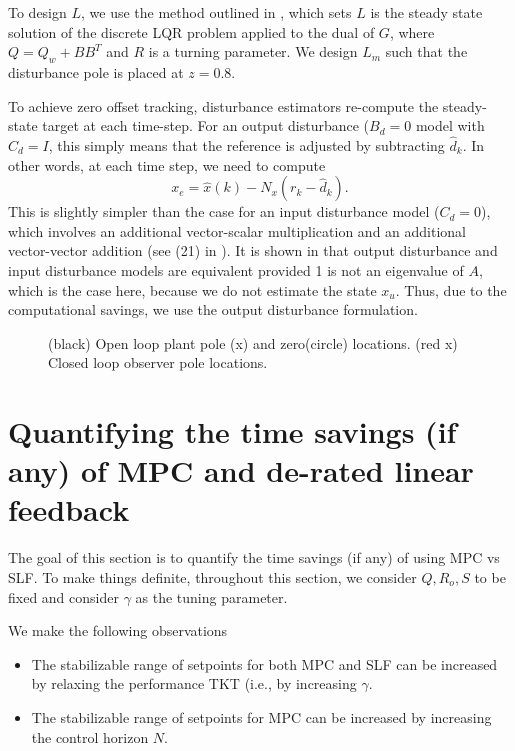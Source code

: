 \documentclass[journal,twocolumn,twoside]{IEEEtran}
\begin{document}
To design $L$, we use the method outlined in \cite{doyle_robustness_1979}, which sets $L$ is the steady state solution of the discrete LQR problem applied to the dual of $G$, where $Q = Q_w + BB^T$ and $R$ is a turning parameter. We design $L_m$ such that the disturbance pole is placed at $z=0.8$.

To achieve zero offset tracking, disturbance estimators re-compute the steady-state target at each time-step. For an output disturbance ($B_d=0$ model with $C_d=I$, this simply means that the reference is adjusted by subtracting $\hat d_k$. In other words, at each time step, we need to compute
\begin{equation}
  x_{e} = \hat{x}(k) - N_x(r_k - \hat{d}_k).
\end{equation}
This is slightly simpler than the case for an input disturbance model ($C_d=0$), which involves an additional vector-scalar multiplication and an additional vector-vector addition (see (21) in \cite{maeder_offset-free_2007}). It is shown in \cite{maeder_offset-free_2007} that output disturbance and input disturbance models are equivalent provided 1 is not an eigenvalue of $A$, which is the case here, because we do not estimate the state $x_u$. Thus, due to the computational savings, we use the output disturbance formulation. 
\begin{figure}
  
  \caption{(black) Open loop plant pole (x) and zero(circle) locations. (red x) Closed loop observer pole locations.}
  \label{fig:obs_cl}
\end{figure}

\section{Quantifying the time savings (if any) of MPC and de-rated linear feedback}
\label{sec:org7edf36d}
The goal of this section is to quantify the time savings (if any) of using MPC vs SLF. To make things definite, throughout this section, we consider $Q, R_o, S$ to be fixed and consider $\gamma$ as the tuning parameter.

We make the following observations
\begin{itemize}
\item The stabilizable range of setpoints for both MPC and SLF can be increased by relaxing the performance TKT (i.e., by increasing $\gamma$.
\item The stabilizable range of setpoints for MPC can be increased by increasing the control horizon $N$.
\end{itemize}
\end{document}
